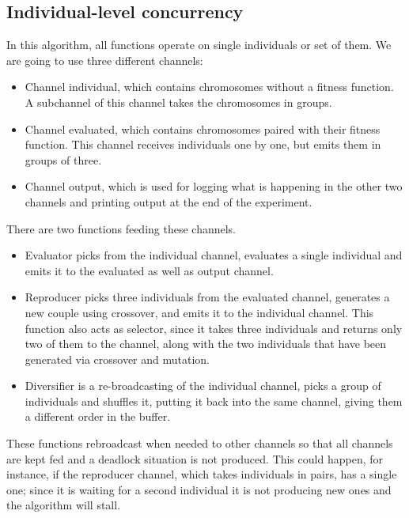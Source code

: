 \documentclass[sigconf]{acmart}
\begin{document}
\subsection{Individual-level concurrency}
\label{ss:indi}

In this algorithm, all functions operate on single individuals or set
of them. We are going to use three different channels:\begin{itemize}
\item Channel {\sf individual}, which contains chromosomes without a fitness
  function. A subchannel of this channel takes the chromosomes in groups.
\item Channel {\sf evaluated}, which contains chromosomes paired with
  their fitness function. This channel receives individuals one by
  one, but emits them in groups of three.
\item Channel {\sf output}, which is used for logging what is
  happening in the other two channels and printing output at the end
  of the experiment.
\end{itemize}

There are two functions feeding these channels. \begin{itemize}
  
\item {\sf Evaluator} picks from the {\sf individual} channel,
  evaluates a single individual and emits it to the {\sf evaluated} as
  well as {\sf output} channel. 
\item {\sf Reproducer} picks three individuals from the {\sf
    evaluated} channel, generates a new couple using crossover, and
  emits it to the {\sf individual} channel. This function also acts as
  selector, since it takes three individuals and returns only two of
  them to the channel, along with the two individuals that have been
  generated via crossover and mutation. 
\item {\sf Diversifier} is a re-broadcasting of the {\sf individual
    channel}, picks a group of individuals and shuffles it, putting it
  back into the same channel, giving them a different order in the
  buffer.
\end{itemize}

These functions rebroadcast when needed to other channels so that all
channels are kept fed and a deadlock situation is not produced. This
could happen, for instance, if the {\sf reproducer channel}, which
takes individuals in pairs, has a single one; since it is waiting for
a second individual it is not producing new ones and the algorithm
will stall. 
\end{document}

